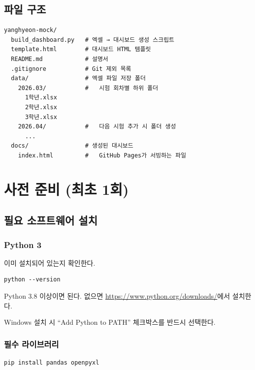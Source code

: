 \documentclass[11pt,a4paper]{article}
\begin{document}
\subsection{파일 구조}
\begin{lstlisting}
yanghyeon-mock/
  build_dashboard.py   # 엑셀 → 대시보드 생성 스크립트
  template.html        # 대시보드 HTML 템플릿
  README.md            # 설명서
  .gitignore           # Git 제외 목록
  data/                # 엑셀 파일 저장 폴더
    2026.03/           #   시험 회차별 하위 폴더
      1학년.xlsx
      2학년.xlsx
      3학년.xlsx
    2026.04/           #   다음 시험 추가 시 폴더 생성
      ...
  docs/                # 생성된 대시보드
    index.html         #   GitHub Pages가 서빙하는 파일
\end{lstlisting}


\section{사전 준비 (최초 1회)}

\subsection{필요 소프트웨어 설치}

\subsubsection{Python 3}

이미 설치되어 있는지 확인한다.

\begin{lstlisting}
python --version
\end{lstlisting}

Python 3.8 이상이면 된다. 없으면 \url{https://www.python.org/downloads/}에서 설치한다.

\begin{warnbox}
Windows 설치 시 ``Add Python to PATH'' 체크박스를 반드시 선택한다.
\end{warnbox}

\subsubsection{필수 라이브러리}

\begin{lstlisting}
pip install pandas openpyxl
\end{lstlisting}
\end{document}
